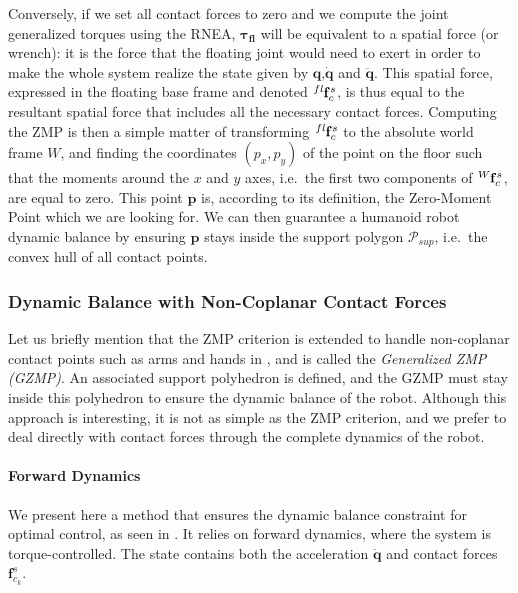 Conversely, if we set all contact forces to zero and we compute the
joint generalized torques using the RNEA, $\boldsymbol{\tau_{fl}}$
will be equivalent to a spatial force (or wrench): it is the force
that the floating joint would need to exert in order to make the whole
system realize the state given by $\mathbf{q}$,$\dot{\mathbf{q}}$ and
$\ddot{\mathbf{q}}$. This spatial force, expressed in the floating
base frame and denoted $\tensor*[^{fl}]{\mathbf{f}}{_c^s}$, is thus
equal to the resultant spatial force that includes all the necessary
contact forces. Computing the ZMP is then a simple matter of
transforming $\tensor*[^{fl}]{\mathbf{f}}{_c^s}$ to the absolute world
frame $W$, and finding the coordinates $(p_x,p_y)$ of the point on the
floor such that the moments around the $x$ and $y$ axes, i.e.\ the
first two components of $\tensor*[^W]{\mathbf{f}}{_c^s}$, are equal to
zero. This point $\mathbf{p}$ is, according to its definition, the
Zero-Moment Point which we are looking for. We can then guarantee a
humanoid robot dynamic balance by ensuring $\mathbf{p}$ stays inside
the support polygon $\mathcal{P}_{sup}$, i.e.\ the convex hull of all
contact points.

\subsubsection{Dynamic Balance with Non-Coplanar Contact Forces}

Let us briefly mention that the ZMP criterion is extended to handle
non-coplanar contact points such as arms and hands in
\cite{harada2003zmp}, and is called the \emph{Generalized ZMP
  (GZMP)}. An associated support polyhedron is defined, and the GZMP
must stay inside this polyhedron to ensure the dynamic balance of the
robot. Although this approach is interesting, it is not as simple as
the ZMP criterion, and we prefer to deal directly with contact forces
through the complete dynamics of the robot.

\paragraph{Forward Dynamics}

We present here a method that ensures the dynamic balance constraint
for optimal control, as seen in \cite{mombaur2005open}. It relies on
forward dynamics, where the system is torque-controlled. The state
contains both the acceleration $\ddot{\mathbf{q}}$ and contact forces
$\mathbf{f}^s_{c_k}$. 

